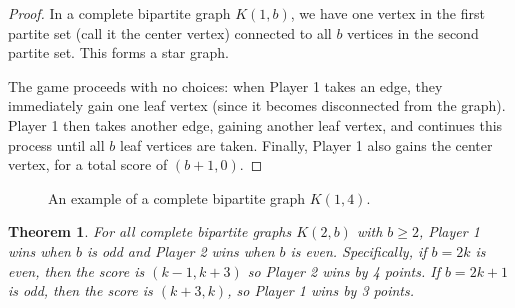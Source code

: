 \documentclass{article}
\newtheorem{theorem}{Theorem}
\begin{document}
\begin{proof}
In a complete bipartite graph $K(1, b)$, we have one vertex in the first partite set (call it the center vertex) connected to all $b$ vertices in the second partite set. This forms a star graph.

The game proceeds with no choices: when Player 1 takes an edge, they immediately gain one leaf vertex (since it becomes disconnected from the graph). Player 1 then takes another edge, gaining another leaf vertex, and continues this process until all $b$ leaf vertices are taken. Finally, Player 1 also gains the center vertex, for a total score of $(b+1, 0)$.
\end{proof}

\begin{figure}[hbt!]
\centering
{}
\caption{An example of a complete bipartite graph $K(1, 4)$.}
\label{fig:k1n}
\end{figure}
\FloatBarrier

\begin{theorem}
For all complete bipartite graphs $K(2, b)$ with $b \geq 2$, Player 1 wins when $b$ is odd and Player 2 wins when $b$ is even. Specifically, if $b = 2k$ is even, then the score is $(k-1, k+3)$ so Player 2 wins by 4 points. If $b = 2k+1$ is odd, then the score is $(k+3, k)$, so Player 1 wins by 3 points.
\end{theorem}
\end{document}
